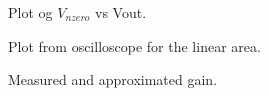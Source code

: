 \documentclass[a4paper,english,11pt]{article}
\begin{document}
\begin{figure}[!htbp]
 \centering
  \caption{Plot og $V_{nzero}$ vs Vout.}
  \label{fig:vnzero:vout}	
\end{figure}

\begin{figure}[!htbp]
 \centering
  \caption{Plot from oscilloscope for the linear area.}
  \label{fig:scope:plot:lin}	
\end{figure}
\begin{figure}[!htbp]
 \centering
  \caption{Measured and approximated gain.}
  \label{fig:mes:approx:gain}	
\end{figure}

\end{document}
